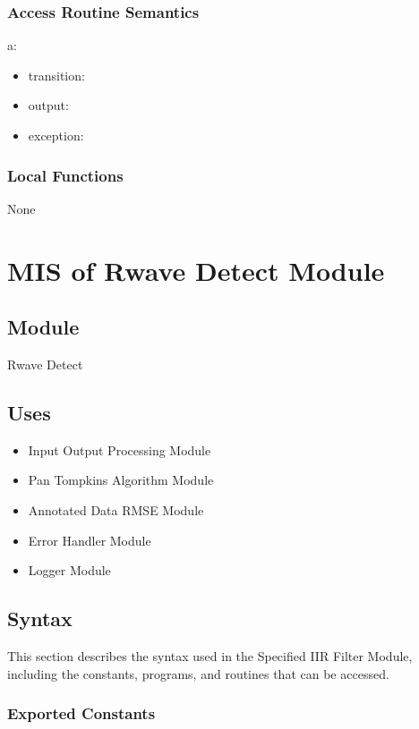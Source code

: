 \documentclass[12pt, titlepage]{article}
\begin{document}
\subsubsection{Access Routine Semantics}

\noindent a:
\begin{itemize}
\item transition: 
\item output: 
\item exception: 
\end{itemize}

\subsubsection{Local Functions}

None

\newpage

\section{MIS of Rwave Detect Module} \label{MIS_Rwave}

\subsection{Module}

Rwave Detect

\subsection{Uses}

\begin{itemize}
\item Input Output Processing Module
\item Pan Tompkins Algorithm Module
\item Annotated Data RMSE Module
\item Error Handler Module
\item Logger Module
\end{itemize}

\subsection{Syntax}

This section describes the syntax used in the Specified IIR Filter Module,
including the constants, programs, and routines that can be accessed.

\subsubsection{Exported Constants}
\end{document}
